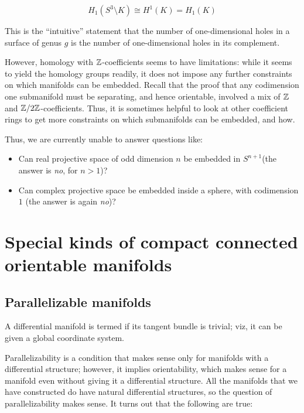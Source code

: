 \documentclass[a4paper]{amsart}
\begin{document}
$$H_1(S^3 \setminus K) \cong H^1(K) = H_1(K)$$

This is the ``intuitive'' statement that the number of one-dimensional
holes in a surface of genus $g$ is the number of one-dimensional holes
in its complement.

However, homology with $\mathbb{Z}$-coefficients seems to have limitations:
while it seems to yield the homology groups readily, it does not
impose any further constraints on which manifolds can be
embedded. Recall that the proof that any codimension one submanifold
must be separating, and hence orientable, involved a mix of $\mathbb{Z}$ and
$\mathbb{Z}/2\mathbb{Z}$-coefficients. Thus, it is sometimes helpful to look at other
coefficient rings to get more constraints on which submanifolds can be
embedded, and how.

Thus, we are currently unable to answer questions like:

\begin{itemize}

\item Can real projective space of odd dimension $n$ be embedded in
  $S^{n+1}$(the answer is {\em no}, for $n > 1$)?

\item Can complex projective space be embedded inside a sphere, with
  codimension $1$ (the answer is again {\em no})?

\end{itemize}

\section{Special kinds of compact connected orientable manifolds}

\subsection{Parallelizable manifolds}

\begin{definer}
  A differential manifold is termed
   if its tangent bundle is
  trivial; viz, it can be given a global coordinate system.
\end{definer}

Parallelizability is a condition that makes sense only for manifolds
with a differential structure; however, it implies orientability,
which makes sense for a manifold even without giving it a differential
structure. All the manifolds that we have constructed do have natural
differential structures, so the question of parallelizability makes
sense. It turns out that the following are true:
\end{document}
